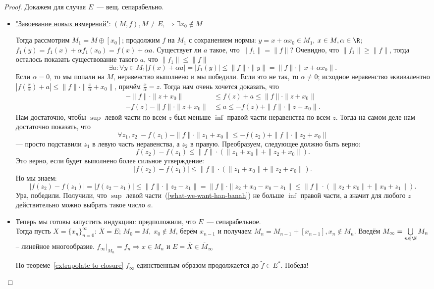 \begin{proof} Докажем для случая $E$~--- вещ. сепарабельно. 
\begin{itemize}
    \item [Шаг 1.] \href{https://www.youtube.com/watch?v=1dWsZjuPVK8}{"Завоевание новых измерений"}: $(M, f), M \neq E, \Rightarrow \exists x_0 \notin M$

Тогда рассмотрим $M_1 = M \oplus [x_0]$; продолжим $f$ на $M_1$ с сохранением нормы: $y = x + \alpha x_0 \in M_1$, $x \in M, \alpha \in \R$; $f_1(y) = f_1(x) + \alpha f_1(x_0) = f(x) + \alpha a$. Существует ли $a$ такое, что $\|f_1\| = \|f\|$? Очевидно, что $\|f_1\| \geqslant \|f\|$, тогда осталось показать существование такого \(a\), что $\|f_1\| \leqslant \|f\|$
\[\exists a: \forall y \in M_1 |f(x) + \alpha a | = |f_1(y)| \leqslant \|f\| \cdot \|y\| = \|f\| \cdot \| x + \alpha x_0\|.\] Если $\alpha = 0$, то мы попали на $M$, неравенство выполнено и мы победили. Если это не так, то $\alpha \neq 0$; исходное неравенство эквивалентно $|f(\frac{x}{\alpha}) + a| \leqslant \|f\| \cdot \| \frac{x}{\alpha} + x_0 \| $, причём $\frac{x}{\alpha} = z$. Тогда нам очень хочется доказать, что
\begin{align}
    - \|f \| \cdot \| z + x_0 \| &\leqslant f(z) + a \leqslant \| f \| \cdot \| z + x_0 \|\\
- f(z) - \|f \| \cdot \| z + x_0 \| &\leqslant a \leqslant - f(z) + \| f \| \cdot \| z + x_0 \|.
\label{what-we-want-han-banah}
\end{align}
Нам достаточно, чтобы $\sup$ левой части по всем $z$ был меньше $\inf$ правой части неравенства по всем $z$. Тогда на самом деле нам достаточно показать, что
\[\forall z_1, z_2\; -f(z_1) - \|f \| \cdot \| z_1 + x_0 \| \leqslant - f(z_2) + \| f \| \cdot \| z_2 + x_0 \| \]--- просто подставили $z_1$ в левую часть неравенства, а $z_2$ в правую. Преобразуем, следующее должно быть верно:
\[f(z_2) - f(z_1) \leqslant \|f\| \cdot (\| z_1 + x_0 \| + \| z_2 + x_0 \|).\]
Это верно, если будет выполнено более сильное утверждение:
\[|f(z_2) - f(z_1)| \leqslant \|f\| \cdot (\| z_1 + x_0 \| + \| z_2 + x_0 \|).\]
Но мы знаем:
\[|f(z_2) - f(z_1)| = |f(z_2 - z_1)| \leqslant \|f\| \cdot \| z_2 - z_1 \| = \|f\| \cdot \| z_2 + x_0 - x_0 - z_1 \| \leqslant \|f\| \cdot (\| z_2 + x_0 \| + \| x_0 + z_1 \| ).\]
Ура, победили. Получили, что $\sup$ левой части~(\ref{what-we-want-han-banah}) не больше $\inf$ правой части, а значит для любого $z$ действительно можно выбрать такое число $a$.
 \item [Шаг 2.] Теперь мы готовы запустить индукцию: предположили, что $E$~--- сепарабельное. \\
 Тогда пусть $X = \{ x_n \}_{n=0}^{\infty}$: $\overline{X} = E$; $M_0 = M,\; x_0 \notin M$, берём $x_{n-1}$ и получаем $M_n = M_{n-1} + [x_{n-1}], x_n \notin M_n $. Введём $M_{\infty} = \bigcup\limits_{n \in \N} M_n$ -- линейное многообразие. $f_{\infty} | _{M_n} = f_n \Rightarrow x \in M_n $ и $E = \overline{X} \in \overline{M}_{\infty}$

По теореме~\ref{extrapolate-to-closure} $f_{\infty}$ единственным образом продолжается до $\widetilde{f} \in E^*$. Победа!
\end{itemize}
\end{proof}

